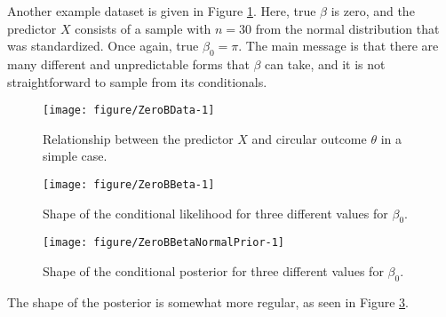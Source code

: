 \documentclass[12pt,a4paper]{article}\usepackage[]{graphicx}\usepackage[]{color}
\makeatletter
\def\maxwidth{ %
  \ifdim\Gin@nat@width>\linewidth
    \linewidth
  \else
    \Gin@nat@width
  \fi
}
\newenvironment{knitrout}{}{} %
\makeatother
\begin{document}
Another example dataset is given in Figure \ref{ZeroBData}. Here, true $\beta$ is zero, and the predictor $X$ consists of a sample with $n=30$ from the normal distribution that was standardized. Once again, true $\beta_0 = \pi$. The main message is that there are many different and unpredictable forms that $\beta$ can take, and it is not straightforward to sample from its conditionals.

\begin{figure}
\label{ZeroBData}
\begin{knitrout}
\color{fgcolor}

{\centering \texttt{[image: figure/ZeroBData-1]} 

}



\end{knitrout}
\caption{Relationship between the predictor $X$ and circular outcome $\theta$ in a simple case.}
\end{figure}



\begin{figure}
\label{ZeroBBeta}
\begin{knitrout}
\color{fgcolor}

{\centering \texttt{[image: figure/ZeroBBeta-1]} 

}



\end{knitrout}
\caption{Shape of the conditional likelihood for three different values for $\beta_0$.}
\end{figure}

\begin{figure}
\label{ZeroBBetaNormalPrior}
\begin{knitrout}
\color{fgcolor}

{\centering \texttt{[image: figure/ZeroBBetaNormalPrior-1]} 

}



\end{knitrout}
\caption{Shape of the conditional posterior for three different values for $\beta_0$.}
\end{figure}

The shape of the posterior is somewhat more regular, as seen in Figure \ref{ZeroBBetaNormalPrior}.
\end{document}
